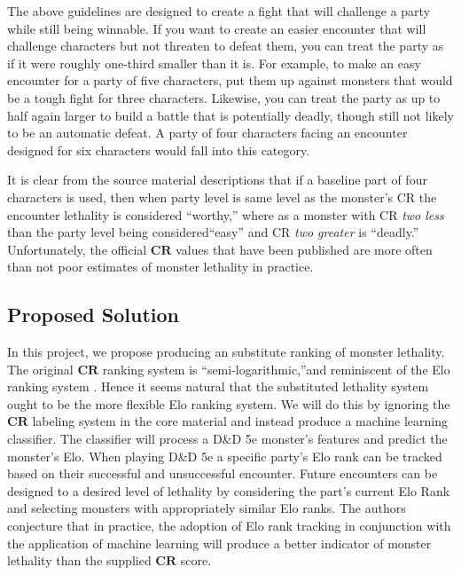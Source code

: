 \documentclass{article}
\newcommand{\CR}{\ensuremath{\mathbf{CR}}\xspace}
\newcommand{\DnD}{D\&D 5e\xspace}
\newcommand{\TierLeast}{\ensuremath{\textsc{Least}}\xspace}
\newcommand{\TierLess}{\ensuremath{\textsc{Less}}\xspace}
\newcommand{\TierFair}{\ensuremath{\textsc{Fair}}\xspace}
\newcommand{\TierMore}{\ensuremath{\textsc{More}}\xspace}
\newcommand{\TierMost}{\ensuremath{\textsc{Most}}\xspace}
\begin{document}
\begin{displayquote}
The above guidelines are designed to create a fight that will challenge a party while still being winnable.
If you want to create an easier encounter that will challenge characters but not threaten to defeat them, you can treat the party as if it were roughly one-third smaller than it is.
For example, to make an easy encounter for a party of five characters, put them up against monsters that would be a tough fight for three characters.
Likewise, you can treat the party as up to half again larger to build a battle that is potentially deadly, though still not likely to be an automatic defeat.
A party of four characters facing an encounter designed for six characters would fall into this category.
\end{displayquote}

It is clear from the source material descriptions that if a baseline part of four characters is used, then when party level is same level as the monster’s CR the encounter lethality is considered ``worthy,'' where as a monster with CR \emph{two less} than the party level being considered``easy'' and CR \emph{two greater} is ``deadly.''
Unfortunately, the official \CR values that have been published are more often than not poor estimates of monster lethality in practice.

\subsection{Proposed Solution}

In this project, we propose producing an substitute ranking of monster lethality.
The original \CR ranking system is ``semi-logarithmic,''and reminiscent of the Elo ranking system \cite{elo1978rating}.
Hence it seems natural that the substituted lethality system ought to be the more flexible Elo ranking system.
We will do this by ignoring the \CR labeling system in the core material and instead produce a machine learning classifier.
The classifier will process a \DnD monster's features and predict the monster's Elo.
When playing \DnD a specific party's Elo rank can be tracked based on their successful and unsuccessful encounter.
Future encounters can be designed to a desired level of lethality by considering the part's current Elo Rank and selecting monsters with appropriately similar Elo ranks.
The authors conjecture that in practice, the adoption of Elo rank tracking in conjunction with the application of machine learning will produce a better indicator of monster lethality than the supplied \CR score.
\end{document}
